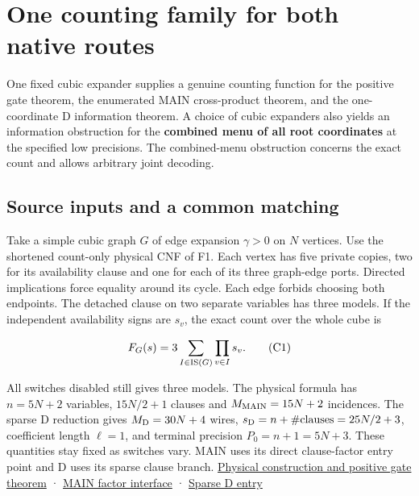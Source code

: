 \documentclass[11pt,a4paper]{article}
\begin{document}
\section{One counting family for both native
routes}\label{v8-section-common-native-family}

One fixed cubic expander supplies a genuine counting function for the
positive gate theorem, the enumerated MAIN cross-product theorem, and
the one-coordinate D information theorem. A choice of cubic expanders
also yields an information obstruction for the \textbf{combined menu of
all root coordinates} at the specified low precisions. The combined-menu
obstruction concerns the exact count and allows arbitrary joint
decoding.

\subsection{Source inputs and a common
matching}\label{v8-source-inputs-and-a-common-matching}

Take a simple cubic graph \(G\) of edge expansion \(\gamma>0\) on \(N\)
vertices. Use the shortened count-only physical CNF of F1. Each vertex
has five private copies, two for its availability clause and one for
each of its three graph-edge ports. Directed implications force equality
around its cycle. Each edge forbids choosing both endpoints. The
detached clause on two separate variables has three models. If the
independent availability signs are \(s_v\), the exact count over the
whole cube is

\[
 F_G(s)=3\sum_{I\in{\rm IS}(G)}\prod_{v\in I}s_v.                 \tag{C1}
\]

All switches disabled still gives three models. The physical formula has
\(n=5N+2\) variables, \(15N/2+1\) clauses and \(M_{\rm MAIN}=15N+2\)
incidences. The sparse D reduction gives \(M_{\rm D}=30N+4\) wires,
\(s_{\rm D}=n+\#\mathrm{clauses}=25N/2+3\), coefficient length
\(\ell=1\), and terminal precision \(P_0=n+1=5N+3\). These quantities
stay fixed as switches vary. MAIN uses its direct clause-factor entry
point and D uses its sparse clause branch.
\hyperref[v8-section-stronger-family]{Physical construction and positive
gate theorem} ·
\href{https://github.com/openai/math/blob/main/preprints/The-Exponential-Time-Hypothesis-is-False-October-25-2026/build/main_full_version.tex\#L1675}{MAIN
factor interface} ·
\href{https://github.com/openai/math/blob/main/preprints/The-Exponential-Time-Hypothesis-is-False-October-25-2026/build/quantitative-reduction.tex\#L65}{Sparse
D entry}
\end{document}
